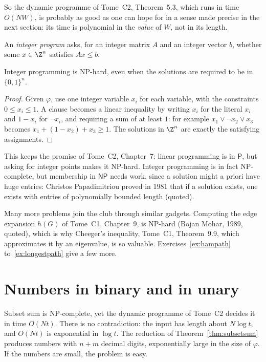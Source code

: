 So the dynamic programme of Tome~C2, Theorem~5.3, which runs in time $O(NW)$, is probably as good as one can hope for in a sense made precise in the next section: its time is polynomial in the \emph{value} of $W$, not in its length.

An \emph{integer program} asks, for an integer matrix $A$ and an integer vector $b$, whether some $x\in\Z^n$ satisfies $Ax\le b$.

\begin{theorem}\label{thm:ip}
Integer programming is NP-hard, even when the solutions are required to be in $\{0,1\}^n$.
\end{theorem}

\begin{proof}
Given $\varphi$, use one integer variable $x_i$ for each variable, with the constraints $0\le x_i\le1$. A clause becomes a linear inequality by writing $x_i$ for the literal $x_i$ and $1-x_i$ for $\neg x_i$, and requiring a sum of at least $1$: for example $x_1\lor\neg x_2\lor x_3$ becomes $x_1+(1-x_2)+x_3\ge1$. The solutions in $\Z^n$ are exactly the satisfying assignments.
\end{proof}

This keeps the promise of Tome~C2, Chapter~7: linear programming is in $\mathsf P$, but asking for integer points makes it NP-hard. Integer programming is in fact NP-complete, but membership in $\mathsf{NP}$ needs work, since a solution might a priori have huge entries: Christos Papadimitriou proved in 1981 that if a solution exists, one exists with entries of polynomially bounded length (quoted).

Many more problems join the club through similar gadgets. Computing the edge expansion $h(G)$ of Tome~C1, Chapter~9, is NP-hard (Bojan Mohar, 1989, quoted), which is why Cheeger's inequality, Tome~C1, Theorem~9.9, which approximates it by an eigenvalue, is so valuable. Exercises~\ref{ex:hampath} to~\ref{ex:longestpath} give a few more.

\section{Numbers in binary and in unary}\label{sec:strong}

Subset sum is NP-complete, yet the dynamic programme of Tome~C2 decides it in time $O(Nt)$. There is no contradiction: the input has length about $N\log t$, and $O(Nt)$ is exponential in $\log t$. The reduction of Theorem~\ref{thm:subsetsum} produces numbers with $n+m$ decimal digits, exponentially large in the size of $\varphi$. If the numbers are small, the problem is easy.

